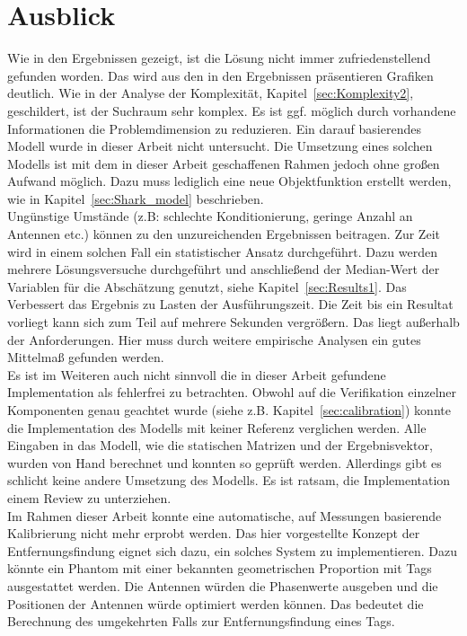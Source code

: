 %
\section{Ausblick}
\label{sec:Calibration_Optimaztion}
%
Wie in den Ergebnissen gezeigt, ist die Lösung nicht immer zufriedenstellend gefunden worden. Das wird aus den in den Ergebnissen präsentieren Grafiken deutlich. Wie in der Analyse der Komplexität, Kapitel~\ref{sec:Komplexity2}, geschildert, ist der Suchraum sehr komplex. Es ist ggf. möglich durch vorhandene Informationen die Problemdimension zu reduzieren. Ein darauf basierendes Modell wurde in dieser Arbeit nicht untersucht. Die Umsetzung eines solchen Modells ist mit dem in dieser Arbeit geschaffenen Rahmen jedoch ohne großen Aufwand möglich. Dazu muss lediglich eine neue Objektfunktion erstellt werden, wie in Kapitel~\ref{sec:Shark_model} beschrieben.\\

Ungünstige Umstände (z.B: schlechte Konditionierung, geringe Anzahl an Antennen etc.) können zu den unzureichenden Ergebnissen beitragen. Zur Zeit wird in einem solchen Fall ein statistischer Ansatz durchgeführt. Dazu werden mehrere Lösungsversuche durchgeführt und anschließend der Median-Wert der Variablen für die Abschätzung genutzt, siehe Kapitel~\ref{sec:Results1}. Das Verbessert das Ergebnis zu Lasten der Ausführungszeit. Die Zeit bis ein Resultat vorliegt kann sich zum Teil auf mehrere Sekunden vergrößern. Das liegt außerhalb der Anforderungen. Hier muss durch weitere empirische Analysen ein gutes Mittelmaß gefunden werden.\\
%

Es ist im Weiteren auch nicht sinnvoll die in dieser Arbeit gefundene Implementation als fehlerfrei zu betrachten. Obwohl auf die Verifikation einzelner Komponenten genau geachtet wurde (siehe z.B. Kapitel~\ref{sec:calibration}) konnte die Implementation des Modells mit keiner Referenz verglichen werden. Alle Eingaben in das Modell, wie die statischen Matrizen und der Ergebnisvektor, wurden von Hand berechnet und konnten so geprüft werden. Allerdings gibt es schlicht keine andere Umsetzung des Modells. Es ist ratsam, die Implementation einem Review zu unterziehen.\\
%

Im Rahmen dieser Arbeit konnte eine automatische, auf Messungen basierende Kalibrierung nicht mehr erprobt werden. Das hier vorgestellte Konzept der Entfernungsfindung eignet sich dazu, ein solches System zu implementieren. Dazu könnte ein Phantom mit einer bekannten geometrischen Proportion mit Tags ausgestattet werden. Die Antennen würden die Phasenwerte ausgeben und die Positionen der Antennen würde optimiert werden können. Das bedeutet die Berechnung des umgekehrten Falls zur Entfernungsfindung eines Tags.\\
%

